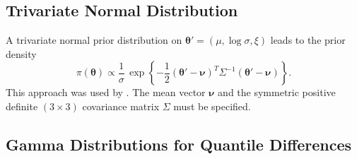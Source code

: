 \documentclass[11pt,a4paper]{article}
\newcommand{\bs}{\boldsymbol}
\begin{document}
\subsection{Trivariate Normal Distribution}

A trivariate normal prior distribution on $\bs{\theta}' = (\mu, \log \sigma, \xi)$ leads to the prior density
\begin{equation}
\pi(\bs{\theta}) \propto \frac{1}{\sigma} \, \exp\left\{-\frac{1}{2} (\bs{\theta}' - \bs{\nu})^T \Sigma^{-1} (\bs{\theta}' - \bs{\nu}) \right\}.
\label{priornorm}
\end{equation}  
This approach was used by \citet{colepowe96}.
The mean vector $\bs{\nu}$ and the symmetric positive definite $(3 \times 3)$ covariance matrix $\Sigma$ must be specified.

\subsection{Gamma Distributions for Quantile Differences}
\label{spriorgamma}
\end{document}
